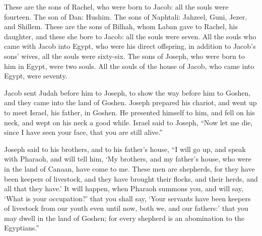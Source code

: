 {These are the sons of Rachel, who were born to Jacob: all the souls were fourteen.
The son of Dan: Hushim.
The sons of Naphtali: Jahzeel, Guni, Jezer, and Shillem.
These are the sons of Bilhah, whom Laban gave to Rachel, his daughter, and these she bore to Jacob: all the souls were seven.
All the souls who came with Jacob into Egypt, who were his direct offspring, in addition to Jacob’s sons’ wives, all the souls were sixty-six.
The sons of Joseph, who were born to him in Egypt, were two souls. All the souls of the house of Jacob, who came into Egypt, were seventy.
\par }{\PP {}Jacob sent Judah before him to Joseph, to show the way before him to Goshen, and they came into the land of Goshen.
Joseph prepared his chariot, and went up to meet Israel, his father, in Goshen. He presented himself to him, and fell on his neck, and wept on his neck a good while.
Israel said to Joseph, “Now let me die, since I have seen your face, that you are still alive.”
\par }{\PP {}Joseph said to his brothers, and to his father’s house, “I will go up, and speak with Pharaoh, and will tell him, ‘My brothers, and my father’s house, who were in the land of Canaan, have come to me.
These men are shepherds, for they have been keepers of livestock, and they have brought their flocks, and their herds, and all that they have.’
It will happen, when Pharaoh summons you, and will say, ‘What is your occupation?’
that you shall say, ‘Your servants have been keepers of livestock from our youth even until now, both we, and our fathers:’ that you may dwell in the land of Goshen; for every shepherd is an abomination to the Egyptians.”

}
